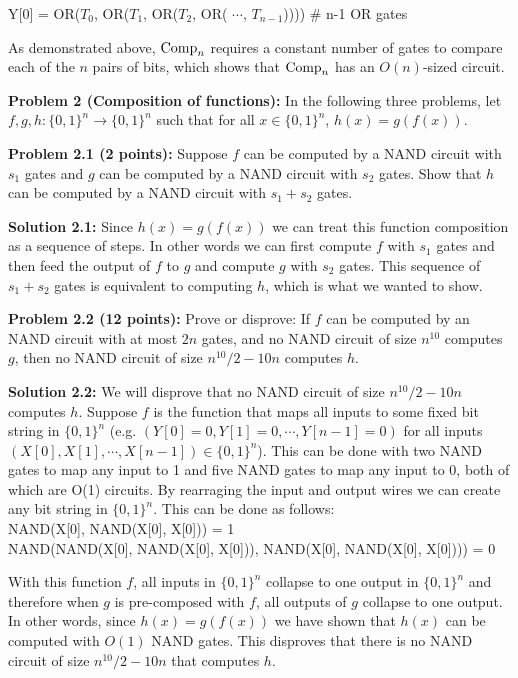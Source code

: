 \documentclass[11pt]{article}
\begin{document}
Y[0] = OR($T_0$, OR($T_1$, OR($T_2$, OR( $\cdots$, $T_{n-1}$)))) \# n-1 OR gates

As demonstrated above, $\mathrm{Comp}_n$ requires a constant number of gates to compare each of the $n$ pairs of bits, which shows that $\mathrm{Comp}_n$ has an $O(n)$-sized circuit.

\newpage

\textbf{Problem 2 (Composition of functions):} In the following three problems, let $f,g,h:\{0,1\}^n \to\{0,1\}^n$ such that for all $x \in \{0,1\}^n$, $h(x) = g(f(x))$. 

\textbf{Problem 2.1 (2 points):} Suppose $f$ can be computed by a NAND circuit with $s_1$ gates and $g$ can be computed by a NAND circuit with $s_2$ gates. Show that $h$ can be computed by a NAND circuit with $s_1 + s_2$ gates. 

\textbf{Solution 2.1:} %
Since $h(x) = g(f(x))$ we can treat this function composition as a sequence of steps. In other words we can first compute $f$ with $s_1$ gates and then feed the output of $f$ to $g$ and compute $g$ with $s_2$ gates.
This sequence of $s_1 + s_2$ gates is equivalent to computing $h$, which is what we wanted to show.

\textbf{Problem 2.2 (12 points):} Prove or disprove: If $f$ can be computed by an  NAND circuit with at most $2n$ gates, and no NAND circuit of size $n^{10}$ computes $g$, then no NAND circuit of size $n^{10}/2-10n$ computes $h$. 

\textbf{Solution 2.2:} %
We will disprove that no NAND circuit of size $n^{10}/2-10n$ computes $h$. Suppose $f$ is the function that maps all inputs to some fixed bit string in $\{0,1\}^n$ (e.g. $(Y[0]=0, Y[1]=0, \cdots, Y[n-1]=0)$ for all inputs $(X[0], X[1], \cdots, X[n-1]) \in \{0,1\}^n$).
This can be done with two NAND gates to map any input to 1 and five NAND gates to map any input to 0, both of which are O(1) circuits. By rearraging the input and output wires we can create any bit string in $\{0,1\}^n$.
This can be done as follows:\\
NAND(X[0], NAND(X[0], X[0])) = 1\\
NAND(NAND(X[0], NAND(X[0], X[0])), NAND(X[0], NAND(X[0], X[0]))) = 0

With this function $f$, all inputs in $\{0,1\}^n$ collapse to one output in $\{0,1\}^n$ and therefore when $g$ is pre-composed with $f$, all outputs of $g$ collapse to one output.
In other words, since $h(x) = g(f(x))$ we have shown that $h(x)$ can be computed with $O(1)$ NAND gates. This disproves that there is no NAND circuit of size $n^{10}/2-10n$ that computes $h$.
\end{document}
